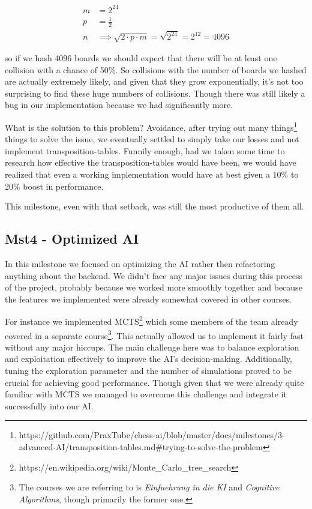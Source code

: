 \begin{align*}
m &= 2^{24} \\
p &= \frac{1}{2} \\
n &\implies \sqrt{2 \cdot p \cdot m} = \sqrt{2^{24}} = 2^{12} = 4096
\end{align*}

so if we hash 4096 boards we should expect that there
will be at least one collision with a chance of 50\%.
So collisions with the number of boards we hashed are actually extremely likely,
and given that they grow exponentially,
it's not too surprising to find these huge numbers of collisions.
Though there was still likely a bug in our implementation
because we had significantly more.

What is the solution to this problem?
Avoidance, after trying out many
things\footnote{https://github.com/PraxTube/chess-ai/blob/master/docs/milestones/3-advanced-AI/transposition-tables.md\#trying-to-solve-the-problem}
things to solve the issue,
we eventually settled to simply take our losses and not implement transposition-tables.
Funnily enough, had we taken some time to research how effective the transposition-tables
would have been, we would have realized that even a working implementation would
have at best given a 10\% to 20\% boost in performance.

This milestone, even with that setback, was still the most productive
of them all.

\subsection{Mst4 - Optimized AI}

In this milestone we focused on optimizing the AI rather
then refactoring anything about the backend. We didn't face any major
issues during this process of the project, probably
because we worked more smoothly together and because
the features we implemented were already somewhat
covered in other courses.

For instance we implemented
MCTS\footnote{https://en.wikipedia.org/wiki/Monte\_Carlo\_tree\_search}
which some members of the team already covered in a separate
course\footnote{The courses we are referring to is \textit{Einfuehrung in die KI}
and \textit{Cognitive Algorithms}, though primarily the former one.}.
This actually allowed us to implement it fairly fast without any major hiccups.
The main challenge here was to balance exploration and exploitation effectively
to improve the AI's decision-making.
Additionally, tuning the exploration parameter
and the number of simulations proved to be crucial for achieving good performance.
Though given that we were already quite familiar with MCTS
we managed to overcome this challenge and integrate it successfully into our AI.

